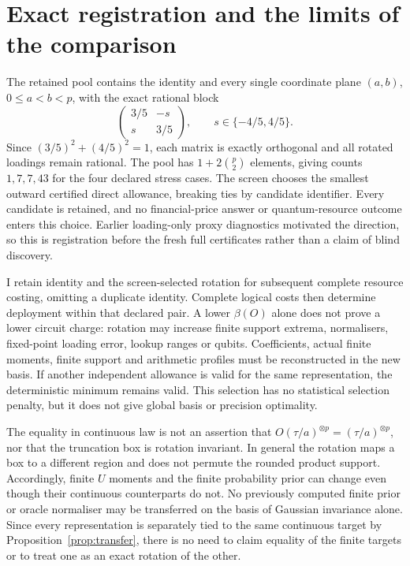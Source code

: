 \documentclass[11pt,a4paper]{article}
\begin{document}
\section{Exact registration and the limits of the comparison}
The retained pool contains the identity and every single coordinate plane
$(a,b)$, $0\leq a<b<p$, with the exact rational block
\[
 \begin{pmatrix}3/5&-s\\s&3/5\end{pmatrix},
 \qquad s\in\{-4/5,4/5\}.
\]
Since $(3/5)^2+(4/5)^2=1$, each matrix is exactly orthogonal and all
rotated loadings remain rational. The pool has $1+2\binom p2$ elements,
giving counts $1,7,7,43$ for the four declared stress cases. The
screen chooses the smallest outward certified direct allowance, breaking
ties by candidate identifier. Every candidate is retained, and no
financial-price answer or quantum-resource outcome enters this choice.
Earlier loading-only proxy diagnostics motivated the direction, so this
is registration before the fresh full certificates rather than a claim
of blind discovery.

I retain identity and the screen-selected rotation for subsequent complete
resource costing, omitting a duplicate identity. Complete logical costs
then determine deployment within that declared pair. A lower
$\beta(O)$ alone does not prove a lower circuit charge: rotation may
increase finite support extrema, normalisers, fixed-point loading error,
lookup ranges or qubits. Coefficients, actual finite moments, finite
support and arithmetic profiles must be reconstructed in the new basis.
If another independent allowance is valid for the same representation,
the deterministic minimum remains valid. This selection has no statistical
selection penalty, but it does not give global basis or precision
optimality.

The equality in continuous law is not an assertion that
$O(\tau/a)^{\otimes p}=(\tau/a)^{\otimes p}$, nor that the truncation
box is rotation invariant. In general the rotation maps a box to a
different region and does not permute the rounded product support.
Accordingly, finite $U$ moments and the finite probability prior can
change even though their continuous counterparts do not. No previously
computed finite prior or oracle normaliser may be transferred on the
basis of Gaussian invariance alone. Since every representation is
separately tied to the same continuous target by
Proposition~\ref{prop:transfer}, there is no need to claim equality of
the finite targets or to treat one as an exact rotation of the other.
\end{document}
